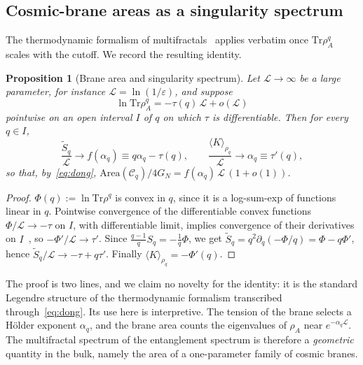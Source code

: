 \documentclass[11pt]{article}
\newtheorem{proposition}{Proposition}[section]
\theoremstyle{definition}\newtheorem{definition}{Definition}[section]
\theoremstyle{remark}\newtheorem*{remark}{Remark}
\newcommand{\Area}{\mathrm{Area}}
\newcommand{\GN}{G_N}
\begin{document}
\subsection{Cosmic-brane areas as a singularity spectrum}
The thermodynamic formalism of multifractals~\cite{Halsey,BeckSchlogl} applies verbatim once
$\mathrm{Tr}\rho_A^q$ scales with the cutoff. We record the resulting identity.

\begin{proposition}[Brane area and singularity spectrum]
\label{prop:brane}
Let $\mathcal L\to\infty$ be a large parameter, for instance $\mathcal L=\ln(1/\varepsilon)$, and suppose
\begin{equation}
\ln\mathrm{Tr}\rho_A^q=-\tau(q)\,\mathcal L+o(\mathcal L)
\label{eq:tau}
\end{equation}
pointwise on an open interval $I$ of $q$ on which $\tau$ is differentiable. Then for every $q\in I$,
\begin{equation}
\frac{\tilde S_q}{\mathcal L}\to f(\alpha_q)\equiv q\alpha_q-\tau(q),\qquad
\frac{\langle K\rangle_{\rho_q}}{\mathcal L}\to\alpha_q\equiv\tau'(q),
\label{eq:fbrane}
\end{equation}
so that, by~\eqref{eq:dong}, $\Area(\mathcal C_q)/4\GN=f(\alpha_q)\,\mathcal L\,(1+o(1))$.
\end{proposition}
\begin{proof}
$\Phi(q):=\ln\mathrm{Tr}\rho^q$ is convex in $q$, since it is a log-sum-exp of functions linear in $q$.
Pointwise convergence of the differentiable convex functions $\Phi/\mathcal L\to-\tau$ on $I$, with
differentiable limit, implies convergence of their derivatives on $I$~\cite[Thm.~25.7]{Rockafellar}, so
$-\Phi'/\mathcal L\to\tau'$. Since $\frac{q-1}{q}S_q=-\frac1q\Phi$, we get
$\tilde S_q=q^2\partial_q(-\Phi/q)=\Phi-q\Phi'$, hence $\tilde S_q/\mathcal L\to-\tau+q\tau'$. Finally
$\langle K\rangle_{\rho_q}=-\Phi'(q)$.
\end{proof}
The proof is two lines, and we claim no novelty for the identity: it is the standard Legendre structure of
the thermodynamic formalism transcribed through~\eqref{eq:dong}. Its use here is interpretive. The tension of
the brane selects a Hölder exponent $\alpha_q$, and the brane area counts the eigenvalues of $\rho_A$ near
$e^{-\alpha_q\mathcal L}$. The multifractal spectrum of the entanglement spectrum is therefore a
\emph{geometric} quantity in the bulk, namely the area of a one-parameter family of cosmic branes.
\end{document}
